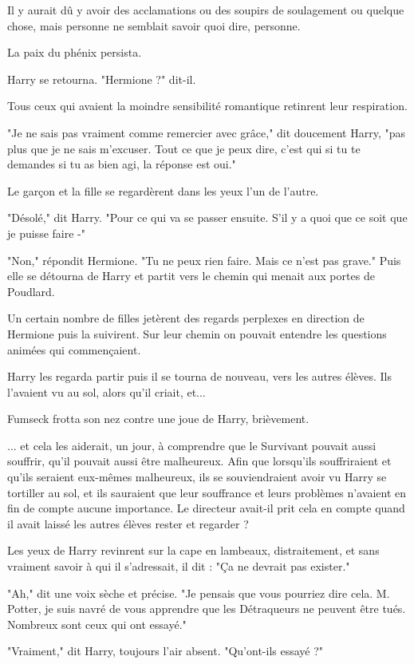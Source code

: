 Il y aurait dû y avoir des acclamations ou des soupirs de soulagement ou quelque chose, mais personne ne semblait savoir quoi dire, personne.

La paix du phénix persista.

Harry se retourna. "Hermione ?" dit-il.

Tous ceux qui avaient la moindre sensibilité romantique retinrent leur respiration.

"Je ne sais pas vraiment comme remercier avec grâce," dit doucement Harry, "pas plus que je ne sais m'excuser. Tout ce que je peux dire, c'est qui si tu te demandes si tu as bien agi, la réponse est oui."

Le garçon et la fille se regardèrent dans les yeux l'un de l'autre.

"Désolé," dit Harry. "Pour ce qui va se passer ensuite. S'il y a quoi que ce soit que je puisse faire -"

"Non," répondit Hermione. "Tu ne peux rien faire. Mais ce n'est pas grave." Puis elle se détourna de Harry et partit vers le chemin qui menait aux portes de Poudlard.

Un certain nombre de filles jetèrent des regards perplexes en direction de Hermione puis la suivirent. Sur leur chemin on pouvait entendre les questions animées qui commençaient.

Harry les regarda partir puis il se tourna de nouveau, vers les autres élèves. Ils l'avaient vu au sol, alors qu'il criait, et...

Fumseck frotta son nez contre une joue de Harry, brièvement.

... et cela les aiderait, un jour, à comprendre que le Survivant pouvait aussi souffrir, qu'il pouvait aussi être malheureux. Afin que lorsqu'ils souffriraient et qu'ils seraient eux-mêmes malheureux, ils se souviendraient avoir vu Harry se tortiller au sol, et ils sauraient que leur souffrance et leurs problèmes n'avaient en fin de compte aucune importance. Le directeur avait-il prit cela en compte quand il avait laissé les autres élèves rester et regarder ?

Les yeux de Harry revinrent sur la cape en lambeaux, distraitement, et sans vraiment savoir à qui il s'adressait, il dit : "Ça ne devrait pas exister."

"Ah," dit une voix sèche et précise. "Je pensais que vous pourriez dire cela. M. Potter, je suis navré de vous apprendre que les Détraqueurs ne peuvent être tués. Nombreux sont ceux qui ont essayé."

"Vraiment," dit Harry, toujours l'air absent. "Qu'ont-ils essayé ?"

